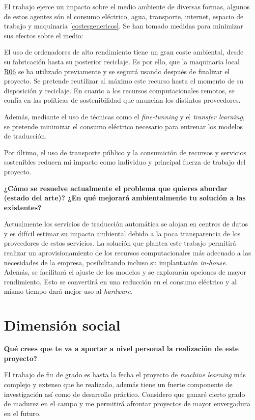 El trabajo ejerce un impacto sobre el medio ambiente de diversas formas, algunos de estos
agentes són el consumo eléctrico, agua, transporte, internet, espacio de trabajo y maquinaria \ref{costesgenericos}.
Se han tomado medidas para minimizar sus efectos sobre el medio:

El uso de ordenadores de alto rendimiento tiene un gran coste ambiental,
desde su fabricación hasta su posterior reciclaje. Es por ello, que la maquinaria
local \hyperref[R06]{R06} se ha utilizado previamente y se seguirá usando después de
finalizar el proyecto. Se pretende reutilizar al máximo este recurso hasta el
momento de su disposición y reciclaje.
En cuanto a los recursos computacionales remotos, se confía en las políticas de sostenibilidad
\cite{awssustainability} que anuncian los distintos proveedores.

Además, mediante el uso de técnicas como el \textit{fine-tunning} y el
\textit{transfer learning}, se pretende minimizar el consumo eléctrico necesario para
entrenar los modelos de traducción.

Por último, el uso de transporte público y la consumición de recursos y servicios sostenibles
reducen mi impacto como individuo y principal fuerza de trabajo del proyecto. 

\textbf{¿Cómo se resuelve actualmente el problema que quieres abordar (estado del arte)?
¿En qué mejorará ambientalmente tu solución a las existentes?}

Actualmente los servicios de traducción automática se alojan en centros de datos y
es difícil estimar su impacto ambiental debido a la poca transparencia de los proveedores
de estos servicios. La solución que plantea este trabajo permitirá realizar un aprovisionamiento
de los recursos computacionales más adecuado a las necesidades de la empresa, posibilitando incluso
su implantación \textit{in-house}. Además, se facilitará el ajuste de los modelos y se
explorarán opciones de mayor rendimiento.
Esto se convertirá en una reducción en el consumo eléctrico y al mismo tiempo dará mejor uso al
\textit{hardware}.


\section{Dimensión social}
\textbf{Qué crees que te va a aportar a nivel personal la realización de este proyecto?}

El trabajo de fin de grado es hasta la fecha el proyecto de \textit{machine learning} más
complejo y extenso que he realizado, además tiene un fuerte componente de investigación
así como de desarrollo práctico. Considero que ganaré cierto grado de madurez
en el campo y me permitirá afrontar proyectos de mayor envergadura en el futuro.

